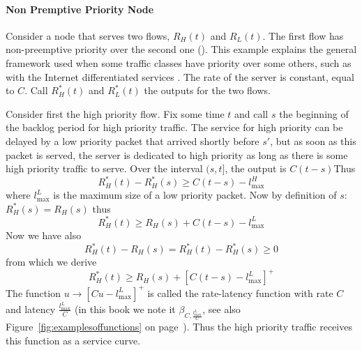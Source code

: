 \paragraph{Non Premptive Priority Node}
 Consider a node that serves two flows,
$R_H(t)$ and $R_L(t)$. The first flow has non-preemptive priority
over the second one (). This example explains the
general framework used when some traffic classes have priority
over some others, such as with the Internet differentiated
services \cite{RFC2475}. The rate of the server is constant, equal
to $C$. Call $R_H^*(t)$ and $R_L^*(t)$ the outputs for the two
flows.
\begin{figure}[!htbp]
\end{figure}
Consider first the high priority flow. Fix some time $t$ and call
$s$ the beginning of the backlog period for high priority traffic.
The service for high priority can be delayed by a low priority
packet that arrived shortly before $s'$, but as soon as this
packet is served, the server is dedicated to high priority as long
as there is some high priority traffic to serve. Over the interval
$(s,t]$, the output is $C(t-s)$Thus
$$R_H^*(t)- R_H^*(s) \geq C(t-s) -l^H_{\max}
$$
where $l^L_{\max}$ is the maximum size of a low priority packet.
Now by definition of $s$: $R_H^*(s)=R_H(s)$ thus
$$R_H^*(t)\geq R_H(s) + C(t-s) -l^L_{\max}
$$
Now we have also
$$R_H^*(t) - R_H(s) = R_H^*(t) - R_H^*(s) \geq 0$$
from which we derive
$$R_H^*(t)\geq R_H(s) + [C(t-s) -l^L_{\max}]^+$$
The function $u \rightarrow [Cu -l^L_{\max}]^+$ is called the
rate-latency function with rate $C$ and latency
$\frac{l^L_{\max}}{C}$ \cite{SV96} (in this book we note it
$\beta_{C,\frac{l^L_{\max}}{C}}$, see also
Figure~\ref{fig:examplesoffunctions} on
page~\pageref{fig:examplesoffunctions}). Thus the high priority
traffic receives this function as a service curve.

